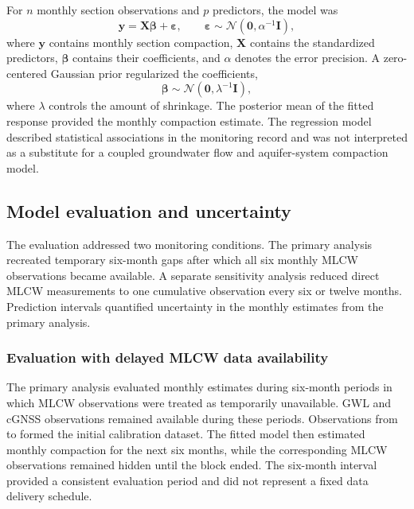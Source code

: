 For $n$ monthly section observations and $p$ predictors, the model was
\begin{equation}
\boldsymbol{y}=\boldsymbol{X}\boldsymbol{\beta}+\boldsymbol{\varepsilon},
\qquad
\boldsymbol{\varepsilon}\sim\mathcal{N}(\boldsymbol{0},\alpha^{-1}\boldsymbol{I}),
\label{eq:brr_likelihood}
\end{equation}
where $\boldsymbol{y}$ contains monthly section compaction, $\boldsymbol{X}$ contains the standardized predictors, $\boldsymbol{\beta}$ contains their coefficients, and $\alpha$ denotes the error precision. A zero-centered Gaussian prior regularized the coefficients,
\begin{equation}
\boldsymbol{\beta}\sim\mathcal{N}(\boldsymbol{0},\lambda^{-1}\boldsymbol{I}),
\label{eq:brr_prior}
\end{equation}
where $\lambda$ controls the amount of shrinkage. The posterior mean of the fitted response provided the monthly compaction estimate. The regression model described statistical associations in the monitoring record and was not interpreted as a substitute for a coupled groundwater flow and aquifer-system compaction model.

\subsection{Model evaluation and uncertainty}
\label{subsec:evaluation_framework}

The evaluation addressed two monitoring conditions. The primary analysis recreated temporary six-month gaps after which all six monthly MLCW observations became available. A separate sensitivity analysis reduced direct MLCW measurements to one cumulative observation every six or twelve months. Prediction intervals quantified uncertainty in the monthly estimates from the primary analysis.

\subsubsection{Evaluation with delayed MLCW data availability}
\label{subsec:delayed_evaluation}

The primary analysis evaluated monthly estimates during six-month periods in which MLCW observations were treated as temporarily unavailable. GWL and cGNSS observations remained available during these periods. Observations from  to  formed the initial calibration dataset. The fitted model then estimated monthly compaction for the next six months, while the corresponding MLCW observations remained hidden until the block ended. The six-month interval provided a consistent evaluation period and did not represent a fixed data delivery schedule.

